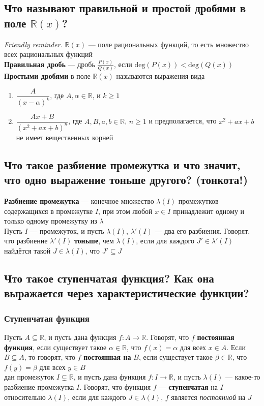 \documentclass[a4paper]{article}
\begin{document}
\subsection{Что называют правильной и простой дробями в поле $\mathbb{R}(x)$?}
\textit{Friendly reminder.} $\mathbb{R}(x)$ — поле рациональных функций, то есть множество всех рациональных функций\\[2mm]
\indent \textbf{Правильная дробь} — дробь $\displaystyle\frac{P(x)}{Q(x)}$, если $\mathrm{deg}(P(x)) < \mathrm{deg}(Q(x))$\\[2mm]
\indent \textbf{Простыми дробями} в поле $\mathbb{R}(x)$ называются выражения вида
\begin{enumerate}
    \item $\dfrac{A}{(x-\alpha)^k}$, где $A,\alpha \in \mathbb{R}$, и $k\geqslant 1$
    \item $\dfrac{Ax + B}{(x^2 + ax + b)^n}$, где $A,B, a,b \in \mathbb{R}$, $n\geqslant 1$ и предполагается, что $x^2 + ax +b$ не имеет вещественных корней
\end{enumerate}
\subsection{Что такое разбиение промежутка и что значит, что одно выражение тоньше другого? (тонкота!)}
\label{1.11}
\textbf{Разбиение промежутка} — конечное множество $\lambda(I)$ промежутков содержащихся в промежутке $I$, при этом любой $x \in I$ принадлежит одному и только одному промежутку из $\lambda$\\[2mm]
\indent Пусть $I$ — промежуток, и пусть $\lambda(I)$, $\lambda'(I)$ — два его разбиения. Говорят, что разбиение $\lambda'(I)$ \textbf{тоньше}, чем $\lambda(I)$, если для каждого $J' \in \lambda'(I)$ найдётся такой $J \in \lambda(I)$, что $J' \subseteq J$

\subsection{Что такое ступенчатая функция? Как она выражается через характеристические функции?}
\subsubsection*{Ступенчатая функция}
Пусть $A \subseteq \mathbb{R}$, и пусть дана функция $f: A \to \mathbb{R}$. Говорят, что $f$ \textbf{постоянная функция}, если существует такое $\alpha \in \mathbb{R}$, что $f(x) = \alpha$ для всех $x \in A$. Если $B \subseteq A$, то говорят, что $f$ \textbf{постоянная на} $B$, если существует такое $\beta \in \mathbb{R}$, что $f(y) = \beta$ для всех $y \in B$\\[2mm]
 дан промежуток $I \subsetneq \mathbb{R}$, и пусть дана функция $f: I \to \mathbb{R}$, и пусть $\lambda(I)$ — какое-то разбиение промежутка $I$. Говорят, что функция $f$ — \textbf{ступенчатая} на $I$ относительно $\lambda(I)$, если для каждого $J \in \lambda(I)$, $f$ является \textit{постоянной} на $J$
\end{document}
